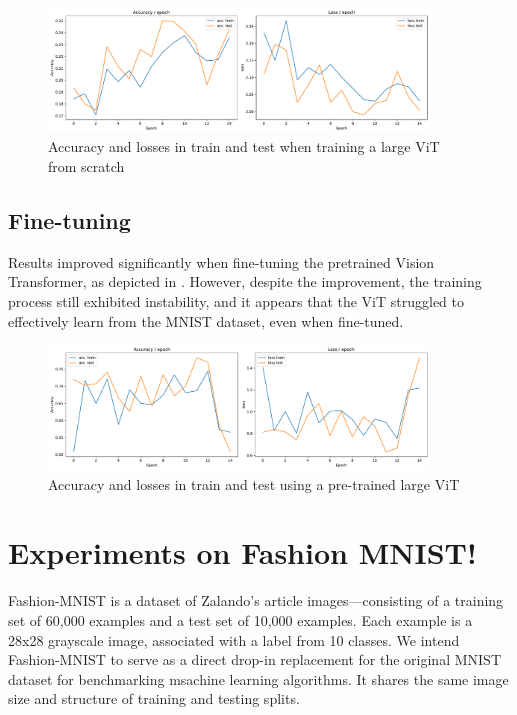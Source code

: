 \begin{figure}[H]
    \centering
    \includegraphics*[width=0.9\textwidth]{figs/Transformers/stats_vit_15.pdf}
    \caption{Accuracy and losses in train and test when training a large ViT from scratch}
    \label{fig:stats_vit}
\end{figure}


\subsection{Fine-tuning}
Results improved significantly when fine-tuning the pretrained Vision Transformer, as depicted in . However, despite the improvement, the training process still exhibited instability, and it appears that the ViT struggled to effectively learn from the MNIST dataset, even when fine-tuned.
\begin{figure}[H]
    \centering
    \includegraphics*[width=0.9\textwidth]{figs/Transformers/stats_vit_pretrained_15.pdf}
    \caption{Accuracy and losses in train and test using a pre-trained large ViT}
    \label{fig:stats_vit_pretrained}
\end{figure}

\section{Experiments on Fashion MNIST!}
Fashion-MNIST is a dataset of Zalando's article images—consisting of a training set of 60,000 examples and a test set of 10,000 examples. Each example is a 28x28 grayscale image, associated with a label from 10 classes. We intend Fashion-MNIST to serve as a direct drop-in replacement for the original MNIST dataset for benchmarking msachine learning algorithms. It shares the same image size and structure of training and testing splits.

